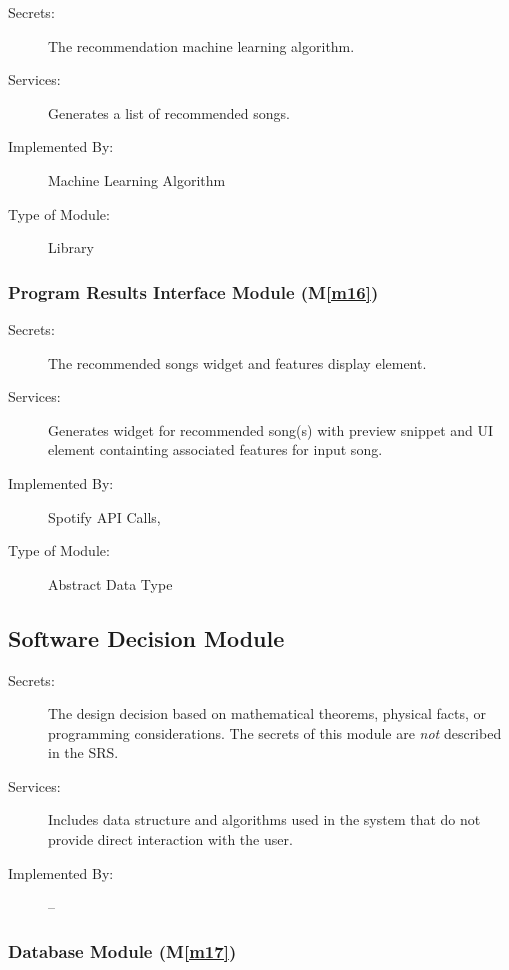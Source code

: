 \documentclass[12pt, titlepage]{article}
\newcommand{\mref}[1]{M\ref{#1}}
\begin{document}
\begin{description}
\item[Secrets:] The recommendation machine learning algorithm. 
\item[Services:] Generates a list of recommended songs. 
\item[Implemented By:] Machine Learning Algorithm
\item[Type of Module:] Library
\end{description}

\subsubsection{Program Results Interface Module (\mref{m16})}

\begin{description}
\item[Secrets:] The recommended songs widget and features display element. 
\item[Services:] Generates widget for recommended song(s) with preview snippet and UI element containting associated features for input song. 
\item[Implemented By:] Spotify API Calls, 
\item[Type of Module:] Abstract Data Type
\end{description}

\subsection{Software Decision Module}

\begin{description}
\item[Secrets:] The design decision based on mathematical theorems, physical
  facts, or programming considerations. The secrets of this module are
  \emph{not} described in the SRS.
\item[Services:] Includes data structure and algorithms used in the system that
  do not provide direct interaction with the user. 
\item[Implemented By:] --
\end{description}

\subsubsection{Database Module (\mref{m17})}
\end{document}
